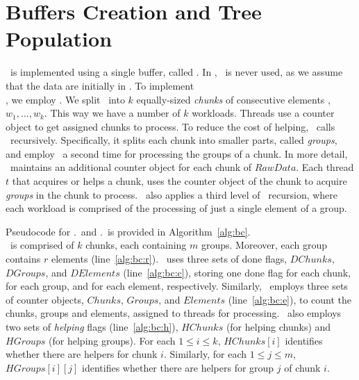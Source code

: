 \section{Buffers Creation and Tree Population} 
\label{sec:buffers_and_tree}

\BC\ is implemented using a single buffer, called \RawData.
In \BC, \Put\ is never used, as we assume that the data are initially in \RawData.
% 
To implement \\
\Traverse, we employ \Refresh.  
We split \RawData\ into $k$ equally-sized {\em chunks} of consecutive 
elements , $w_1, \ldots, w_k$. This way we have a number of 
$k$ workloads. 
Threads use a counter object to get assigned chunks to process.
To reduce the cost of helping, \Fresh\ calls \Refresh\ recursively.
Specifically, it splits each chunk into smaller parts,
called {\em groups}, and employ \Refresh\ a second time for processing the groups of a chunk.
% 
In more detail, \Fresh\ maintains an additional counter object 
for each chunk of $RawData$. 
Each thread $t$ that acquires or helps a chunk, uses the counter object of the chunk to acquire
{\em groups} in the chunk to process. \Fresh\ also applies a third level of \Refresh\ recursion,
where each workload is comprised of the processing of just a single element of a group. 

Pseudocode for \BC.\Put\ and \BC.\Traverse\ is provided 
in Algorithm~\ref{alg:bc}. \\ \RawData\ is comprised of $k$ chunks,
each containing $m$ groups. Moreover, each group contains $r$ elements (line~\ref{alg:bc:r}). 
\Fresh\ uses three sets of done flags, $\mathit{DChunks}$, $\mathit{DGroups}$,
and $\mathit{DElements}$ (line~\ref{alg:bc:c}), storing one done flag for each chunk,
for each group, and for each element, respectively.
% 
Similarly, \Fresh\ employs three sets of counter objects, $\mathit{Chunks}$, $\mathit{Groups}$,
and $\mathit{Elements}$ (line~\ref{alg:bc:e}), to count the chunks, groups and elements, assigned
to threads for processing. 
%
\Fresh\ also employs two sets of {\em helping} flags (line~\ref{alg:bc:h}), 
$\mathit{HChunks}$  (for helping chunks) and $\mathit{HGroups}$ (for helping groups). 
For each $1 \leq i \leq k$, $\mathit{HChunks[i]}$ identifies whether there are helpers for chunk $i$.
Similarly, for each $1 \leq j \leq m$, $\mathit{HGroups[i][j]}$ identifies whether there are helpers
for group $j$ of chunk $i$. 

